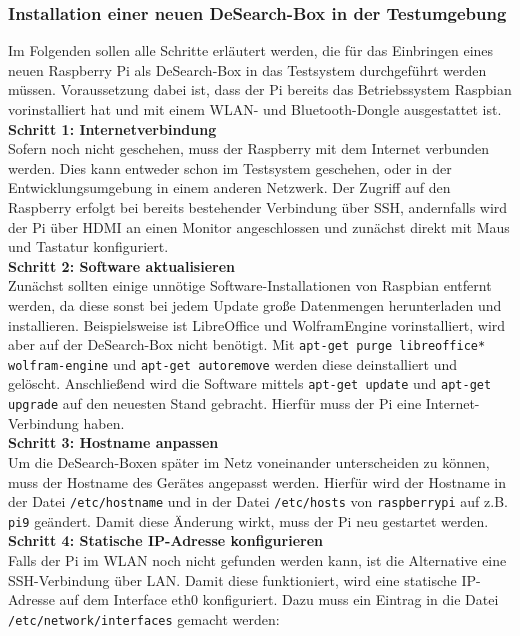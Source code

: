 \newpage
\subsubsection{Installation einer neuen DeSearch-Box in der Testumgebung}\label{sssec:schritte}
Im Folgenden sollen alle Schritte erläutert werden, die für das Einbringen eines neuen Raspberry Pi als DeSearch-Box in das Testsystem durchgeführt werden müssen.
Voraussetzung dabei ist, dass der Pi bereits das Betriebssystem Raspbian vorinstalliert hat und mit einem WLAN- und Bluetooth-Dongle ausgestattet ist.\\
\textbf{Schritt 1: Internetverbindung}\\
Sofern noch nicht geschehen, muss der Raspberry mit dem Internet verbunden werden. Dies kann entweder schon im Testsystem geschehen, oder in der Entwicklungsumgebung in einem anderen Netzwerk. Der Zugriff auf den Raspberry erfolgt bei bereits bestehender Verbindung über SSH, andernfalls wird der Pi über HDMI an einen Monitor angeschlossen und zunächst direkt mit Maus und Tastatur konfiguriert. \\
\textbf{Schritt 2: Software aktualisieren}\\
Zunächst sollten einige unnötige Software-Installationen von Raspbian entfernt werden, da diese sonst bei jedem Update große Datenmengen herunterladen und installieren. Beispielsweise ist LibreOffice und WolframEngine vorinstalliert, wird aber auf der DeSearch-Box nicht benötigt. Mit \texttt{apt-get purge libreoffice* wolfram-engine} und \texttt{apt-get autoremove} werden diese deinstalliert und gelöscht. Anschließend wird die Software mittels \texttt{apt-get update} und \texttt{apt-get upgrade} auf den neuesten Stand gebracht. Hierfür muss der Pi eine Internet-Verbindung haben.\\
\textbf{Schritt 3: Hostname anpassen}\\
Um die DeSearch-Boxen später im Netz voneinander unterscheiden zu können, muss der Hostname des Gerätes angepasst werden. Hierfür wird der Hostname in der Datei \texttt{/etc/hostname} und in der Datei \texttt{/etc/hosts} von \texttt{raspberrypi} auf z.B. \texttt{pi9} geändert. Damit diese Änderung wirkt, muss der Pi neu gestartet werden.\\
\textbf{Schritt 4: Statische IP-Adresse konfigurieren}\\
Falls der Pi im WLAN noch nicht gefunden werden kann, ist die Alternative eine SSH-Verbindung über LAN. Damit diese funktioniert, wird eine statische IP-Adresse auf dem Interface eth0 konfiguriert. Dazu muss ein Eintrag in die Datei \texttt{/etc/network/interfaces} gemacht werden:\\
